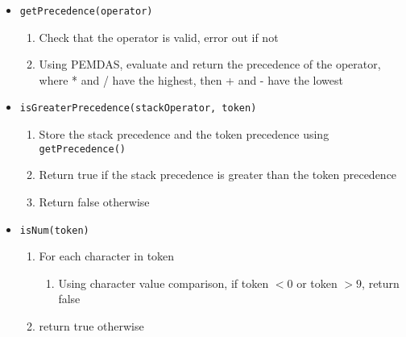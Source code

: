 \documentclass{article}
\begin{document}
\begin{itemize}
            \item{\texttt{getPrecedence(operator)}}
                \begin{enumerate}
                    \item Check that the operator is valid, error out if not
                    \item Using PEMDAS, evaluate and return the precedence of the operator, where * and / have the highest, then + and - have the lowest
                \end{enumerate}

            \item{\texttt{isGreaterPrecedence(stackOperator, token)}}
                \begin{enumerate}
                    \item Store the stack precedence and the token precedence using \texttt{getPrecedence()}
                    \item Return true if the stack precedence is greater than the token precedence
                    \item Return false otherwise
                \end{enumerate}

            \item{\texttt{isNum(token)}}
                \begin{enumerate}
                    \item For each character in token
                    \begin{enumerate}
                        \item Using character value comparison, if token $< 0$ or token $> 9$, return false
                    \end{enumerate}
                    \item return true otherwise
                \end{enumerate}


\end{itemize}
\end{document}

